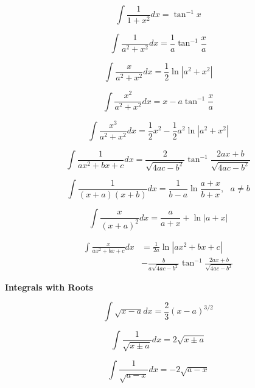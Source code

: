 \documentclass[11pt,twoside]{article}
\begin{document}
\begin{multicols}{3}
\begin{footnotesize}
\begin{equation}
\int \frac{1}{1+x^2}dx = \tan^{-1}x
\end{equation}

\begin{equation}
\int \frac{1}{a^2+x^2}dx = \frac{1}{a}\tan^{-1}\frac{x}{a}
\end{equation}

\begin{equation}
\int \frac{x}{a^2+x^2}dx = \frac{1}{2}\ln|a^2+x^2|
\end{equation}

\begin{equation}
\int \frac{x^2}{a^2+x^2}dx = x-a\tan^{-1}\frac{x}{a}
\end{equation}

\begin{equation}
\int \frac{x^3}{a^2+x^2}dx = \frac{1}{2}x^2-\frac{1}{2}a^2\ln|a^2+x^2|
\end{equation}

\begin{equation}
\int \frac{1}{ax^2+bx+c}dx = \frac{2}{\sqrt{4ac-b^2}}\tan^{-1}\frac{2ax+b}{\sqrt{4ac-b^2}}
\end{equation}

\begin{equation}
\int \frac{1}{(x+a)(x+b)}dx = \frac{1}{b-a}\ln\frac{a+x}{b+x}, \text{ } a\ne b
\end{equation}

\begin{equation}
\int \frac{x}{(x+a)^2}dx = \frac{a}{a+x}+\ln |a+x|
\end{equation}


\begin{align}
\int \frac{x}{ax^2+bx+c}dx &= \frac{1}{2a}\ln|ax^2+bx+c| \nonumber
\\&-\frac{b}{a\sqrt{4ac-b^2}}\tan^{-1}\frac{2ax+b}{\sqrt{4ac-b^2}}
\end{align}
\begin{center} \textbf{Integrals with Roots} \end{center}

\begin{equation}
\int \sqrt{x-a} dx = \frac{2}{3}(x-a)^{3/2}
\end{equation}

\begin{equation}
\int \frac{1}{\sqrt{x\pm a}} dx = 2\sqrt{x\pm a}
\end{equation}

\begin{equation}
\int \frac{1}{\sqrt{a-x}} dx = -2\sqrt{a-x}
\end{equation}


\end{footnotesize}
\end{multicols}
\end{document}
